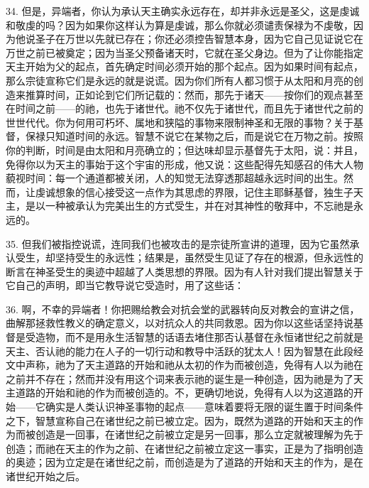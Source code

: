 34. 但是，异端者，你认为承认天主确实永远存在，却并非永远是圣父，这是虔诚和敬虔的吗？因为如果你这样认为算是虔诚，那么你就必须谴责保禄为不虔敬，因为他说圣子在万世以先就已存在；你还必须控告智慧本身，因为它自己见证说它在万世之前已被奠定；因为当圣父预备诸天时，它就在圣父身边。但为了让你能指定天主开始为父的起点，首先确定时间必须开始的那个起点。因为如果时间有起点，那么宗徒宣称它们是永远的就是说谎。因为你们所有人都习惯于从太阳和月亮的创造来推算时间，正如论到它们所记载的：然而，那先于诸天——按你们的观点甚至在时间之前——的祂，也先于诸世代。祂不仅先于诸世代，而且先于诸世代之前的世世代代。你为何用可朽坏、属地和狭隘的事物来限制神圣和无限的事物？关于基督，保禄只知道时间的永远。智慧不说它在某物之后，而是说它在万物之前。按照你的判断，时间是由太阳和月亮确立的；但达味却显示基督先于太阳，说：并且，免得你以为天主的事始于这个宇宙的形成，他又说：这些配得先知感召的伟大人物藐视时间：每一个通道都被关闭，人的知觉无法穿透那超越永远时间的出生。然而，让虔诚想象的信心接受这一点作为其思虑的界限，记住主耶稣基督，独生子天主，是以一种被承认为完美出生的方式受生，并在对其神性的敬拜中，不忘祂是永远的。\par

35. 但我们被指控说谎，连同我们也被攻击的是宗徒所宣讲的道理，因为它虽然承认受生，却坚持受生的永远性；结果是，虽然受生见证了存在的根源，但永远性的断言在神圣受生的奥迹中超越了人类思想的界限。因为有人针对我们提出智慧关于它自己的声明，即当它教导说它受造时，用了这些话：\par

36. 啊，不幸的异端者！你把赐给教会对抗会堂的武器转向反对教会的宣讲之信，曲解那拯救性教义的确定意义，以对抗众人的共同救恩。因为你以这些话坚持说基督是受造物，而不是用永生活智慧的话语去堵住那否认基督在永恒诸世纪之前就是天主、否认祂的能力在人子的一切行动和教导中活跃的犹太人！因为智慧在此段经文中声称，祂为了天主道路的开始和祂从太初的作为而被创造，免得有人以为祂在之前并不存在；然而并没有用这个词来表示祂的诞生是一种创造，因为祂是为了天主道路的开始和祂的作为而被创造的。不，更确切地说，免得有人以为这道路的开始——它确实是人类认识神圣事物的起点——意味着要将无限的诞生置于时间条件之下，智慧宣称自己在诸世纪之前已被立定。因为，既然为道路的开始和天主的作为而被创造是一回事，在诸世纪之前被立定是另一回事，那么立定就被理解为先于创造；而祂在天主的作为之前、在诸世纪之前被立定这一事实，正是为了指明创造的奥迹；因为立定是在诸世纪之前，而创造是为了道路的开始和天主的作为，是在诸世纪开始之后。\par

